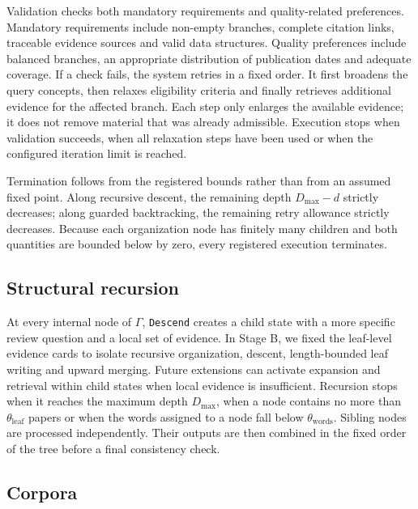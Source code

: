 \documentclass[11pt,a4paper]{article}
\begin{document}
Validation checks both mandatory requirements and quality-related preferences. Mandatory requirements include non-empty branches, complete citation links, traceable evidence sources and valid data structures. Quality preferences include balanced branches, an appropriate distribution of publication dates and adequate coverage. If a check fails, the system retries in a fixed order. It first broadens the query concepts, then relaxes eligibility criteria and finally retrieves additional evidence for the affected branch. Each step only enlarges the available evidence; it does not remove material that was already admissible. Execution stops when validation succeeds, when all relaxation steps have been used or when the configured iteration limit is reached.

Termination follows from the registered bounds rather than from an assumed fixed point. Along recursive descent, the remaining depth $D_{\max}-d$ strictly decreases; along guarded backtracking, the remaining retry allowance strictly decreases. Because each organization node has finitely many children and both quantities are bounded below by zero, every registered execution terminates.

\subsection*{Structural recursion}

At every internal node of $\Gamma$, \texttt{Descend} creates a child state with a more specific review question and a local set of evidence. In Stage B, we fixed the leaf-level evidence cards to isolate recursive organization, descent, length-bounded leaf writing and upward merging. Future extensions can activate expansion and retrieval within child states when local evidence is insufficient. Recursion stops when it reaches the maximum depth $D_{\max}$, when a node contains no more than $\theta_{\mathrm{leaf}}$ papers or when the words assigned to a node fall below $\theta_{\mathrm{words}}$. Sibling nodes are processed independently. Their outputs are then combined in the fixed order of the tree before a final consistency check.

\subsection*{Corpora}
\end{document}
